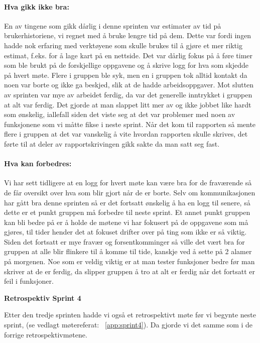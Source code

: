 \documentclass[12pt,a4paper,norsk]{article}
\begin{document}
\paragraph{Hva gikk ikke bra:}
En av tingene som gikk dårlig i denne sprinten var estimater av tid på brukerhistoriene, vi regnet med å bruke lengre tid på dem. Dette var fordi ingen hadde nok erfaring med verktøyene som skulle brukes til å gjøre et mer riktig estimat, f.eks. for å lage kart på en nettside.
Det var dårlig fokus på å føre timer som ble brukt på de forskjellige oppgavene og å skrive logg for hva som skjedde på hvert møte.
Flere i gruppen ble syk, men en i gruppen tok alltid kontakt da noen var borte og ikke ga beskjed, slik at de hadde arbeidsoppgaver.
Mot slutten av sprinten var mye av arbeidet ferdig, da var det generelle inntrykket i gruppen at alt var ferdig. Det gjorde at man slappet litt mer av og ikke jobbet like hardt som ønskelig, iallefall siden det viste seg at det var problemer med noen av funksjonene som vi måtte fikse i neste sprint.
Når det kom til rapporten så mente flere i gruppen at det var vanskelig å vite hvordan rapporten skulle skrives, det førte til at deler av rapportskrivingen gikk sakte da man satt seg fast.

\paragraph{Hva kan forbedres:}
Vi har sett tidligere at en logg for hvert møte kan være bra for de fraværende så de får oversikt over hva som blir gjort når de er borte. Selv om kommunikasjonen har gått bra denne sprinten så er det fortsatt ønskelig å ha en logg til senere, så dette er et punkt gruppen må forbedre til neste sprint.
Et annet punkt gruppen kan bli bedre på er å holde de møtene vi har fokusert på de oppgavene som må gjøres, til tider hender det at fokuset drifter over på ting som ikke er så viktig. Siden det fortsatt er mye fravær og forsentkomminger så ville det vært bra for gruppen at alle blir flinkere til å komme til tide, kanskje ved å sette på 2 alamer på morgenen.
Noe som er veldig viktig er at man tester funksjoner bedre før man skriver at de er ferdig, da slipper gruppen å tro at alt er ferdig når det fortsatt er feil i funksjoner.


\bigskip \noindent \textbf{Retrospektiv Sprint 4}
\par Etter den tredje sprinten hadde vi også et retrospektivt møte før vi begynte neste sprint, (se vedlagt møtereferat: ~\cref{app:sprint4}). Da gjorde vi det samme som i de forrige retrospektivmøtene.
\end{document}
